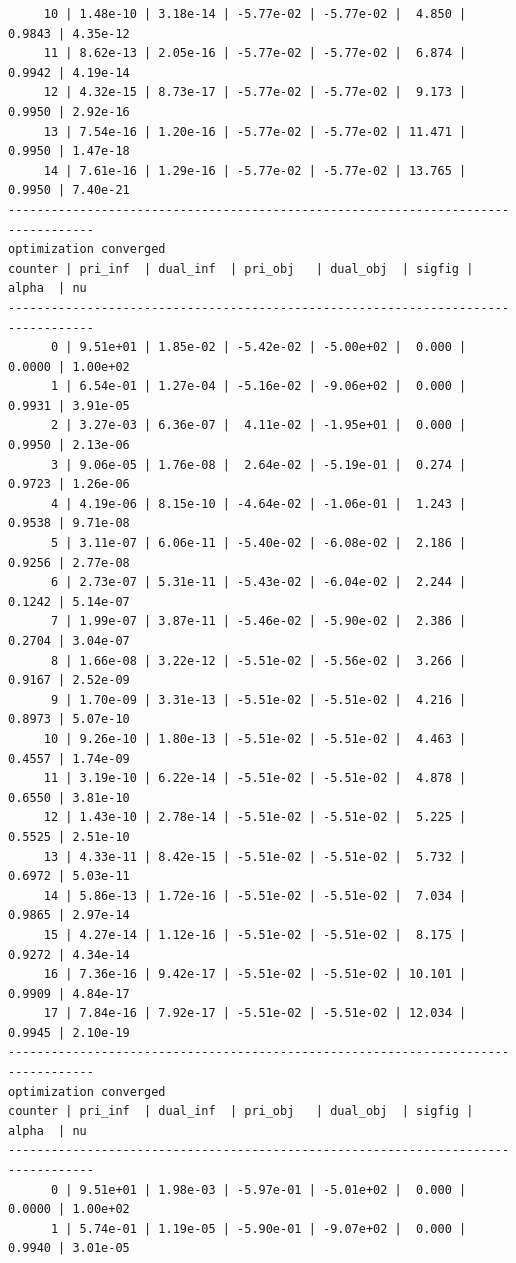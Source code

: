 \documentclass[
]{book}
\begin{document}
\begin{verbatim}
     10 | 1.48e-10 | 3.18e-14 | -5.77e-02 | -5.77e-02 |  4.850 | 0.9843 | 4.35e-12
     11 | 8.62e-13 | 2.05e-16 | -5.77e-02 | -5.77e-02 |  6.874 | 0.9942 | 4.19e-14
     12 | 4.32e-15 | 8.73e-17 | -5.77e-02 | -5.77e-02 |  9.173 | 0.9950 | 2.92e-16
     13 | 7.54e-16 | 1.20e-16 | -5.77e-02 | -5.77e-02 | 11.471 | 0.9950 | 1.47e-18
     14 | 7.61e-16 | 1.29e-16 | -5.77e-02 | -5.77e-02 | 13.765 | 0.9950 | 7.40e-21
----------------------------------------------------------------------------------
optimization converged
counter | pri_inf  | dual_inf  | pri_obj   | dual_obj  | sigfig | alpha  | nu 
----------------------------------------------------------------------------------
      0 | 9.51e+01 | 1.85e-02 | -5.42e-02 | -5.00e+02 |  0.000 | 0.0000 | 1.00e+02
      1 | 6.54e-01 | 1.27e-04 | -5.16e-02 | -9.06e+02 |  0.000 | 0.9931 | 3.91e-05
      2 | 3.27e-03 | 6.36e-07 |  4.11e-02 | -1.95e+01 |  0.000 | 0.9950 | 2.13e-06
      3 | 9.06e-05 | 1.76e-08 |  2.64e-02 | -5.19e-01 |  0.274 | 0.9723 | 1.26e-06
      4 | 4.19e-06 | 8.15e-10 | -4.64e-02 | -1.06e-01 |  1.243 | 0.9538 | 9.71e-08
      5 | 3.11e-07 | 6.06e-11 | -5.40e-02 | -6.08e-02 |  2.186 | 0.9256 | 2.77e-08
      6 | 2.73e-07 | 5.31e-11 | -5.43e-02 | -6.04e-02 |  2.244 | 0.1242 | 5.14e-07
      7 | 1.99e-07 | 3.87e-11 | -5.46e-02 | -5.90e-02 |  2.386 | 0.2704 | 3.04e-07
      8 | 1.66e-08 | 3.22e-12 | -5.51e-02 | -5.56e-02 |  3.266 | 0.9167 | 2.52e-09
      9 | 1.70e-09 | 3.31e-13 | -5.51e-02 | -5.51e-02 |  4.216 | 0.8973 | 5.07e-10
     10 | 9.26e-10 | 1.80e-13 | -5.51e-02 | -5.51e-02 |  4.463 | 0.4557 | 1.74e-09
     11 | 3.19e-10 | 6.22e-14 | -5.51e-02 | -5.51e-02 |  4.878 | 0.6550 | 3.81e-10
     12 | 1.43e-10 | 2.78e-14 | -5.51e-02 | -5.51e-02 |  5.225 | 0.5525 | 2.51e-10
     13 | 4.33e-11 | 8.42e-15 | -5.51e-02 | -5.51e-02 |  5.732 | 0.6972 | 5.03e-11
     14 | 5.86e-13 | 1.72e-16 | -5.51e-02 | -5.51e-02 |  7.034 | 0.9865 | 2.97e-14
     15 | 4.27e-14 | 1.12e-16 | -5.51e-02 | -5.51e-02 |  8.175 | 0.9272 | 4.34e-14
     16 | 7.36e-16 | 9.42e-17 | -5.51e-02 | -5.51e-02 | 10.101 | 0.9909 | 4.84e-17
     17 | 7.84e-16 | 7.92e-17 | -5.51e-02 | -5.51e-02 | 12.034 | 0.9945 | 2.10e-19
----------------------------------------------------------------------------------
optimization converged
counter | pri_inf  | dual_inf  | pri_obj   | dual_obj  | sigfig | alpha  | nu 
----------------------------------------------------------------------------------
      0 | 9.51e+01 | 1.98e-03 | -5.97e-01 | -5.01e+02 |  0.000 | 0.0000 | 1.00e+02
      1 | 5.74e-01 | 1.19e-05 | -5.90e-01 | -9.07e+02 |  0.000 | 0.9940 | 3.01e-05

\end{verbatim}
\end{document}
